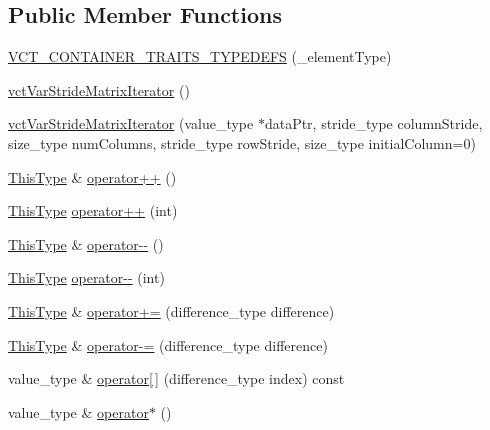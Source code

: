 \subsection*{Public Member Functions}
\begin{DoxyCompactItemize}
\item 
\hyperlink{classvct_var_stride_matrix_iterator_ad10863eaa1222765fd9eeb8dfb58bd41}{V\+C\+T\+\_\+\+C\+O\+N\+T\+A\+I\+N\+E\+R\+\_\+\+T\+R\+A\+I\+T\+S\+\_\+\+T\+Y\+P\+E\+D\+E\+F\+S} (\+\_\+element\+Type)
\item 
\hyperlink{classvct_var_stride_matrix_iterator_a91d9083a1180d5eea8a91f9fd013eb95}{vct\+Var\+Stride\+Matrix\+Iterator} ()
\item 
\hyperlink{classvct_var_stride_matrix_iterator_a458fe56a6f92431c0b63aebbbb87e257}{vct\+Var\+Stride\+Matrix\+Iterator} (value\+\_\+type $\ast$data\+Ptr, stride\+\_\+type column\+Stride, size\+\_\+type num\+Columns, stride\+\_\+type row\+Stride, size\+\_\+type initial\+Column=0)
\item 
\hyperlink{classvct_var_stride_matrix_const_iterator_af68182ea2024c532e999fd1333cb0c6e}{This\+Type} \& \hyperlink{classvct_var_stride_matrix_iterator_a4b8fe42309794755c854d04efb2eb90b}{operator++} ()
\item 
\hyperlink{classvct_var_stride_matrix_const_iterator_af68182ea2024c532e999fd1333cb0c6e}{This\+Type} \hyperlink{classvct_var_stride_matrix_iterator_a5ff0237367032cd027470c1f23edd943}{operator++} (int)
\item 
\hyperlink{classvct_var_stride_matrix_const_iterator_af68182ea2024c532e999fd1333cb0c6e}{This\+Type} \& \hyperlink{classvct_var_stride_matrix_iterator_a55ff9d23cd962659b4057c3f9fc34cdf}{operator-\/-\/} ()
\item 
\hyperlink{classvct_var_stride_matrix_const_iterator_af68182ea2024c532e999fd1333cb0c6e}{This\+Type} \hyperlink{classvct_var_stride_matrix_iterator_a6d10e5918b881d69c226855fe90bfa7a}{operator-\/-\/} (int)
\item 
\hyperlink{classvct_var_stride_matrix_const_iterator_af68182ea2024c532e999fd1333cb0c6e}{This\+Type} \& \hyperlink{classvct_var_stride_matrix_iterator_a44a3c7884b5092d51a2c17d87096a69e}{operator+=} (difference\+\_\+type difference)
\item 
\hyperlink{classvct_var_stride_matrix_const_iterator_af68182ea2024c532e999fd1333cb0c6e}{This\+Type} \& \hyperlink{classvct_var_stride_matrix_iterator_ab72c54ac990087995a41e0a6b99bd9de}{operator-\/=} (difference\+\_\+type difference)
\item 
value\+\_\+type \& \hyperlink{classvct_var_stride_matrix_iterator_a84a6c213039c241a96a80888c4054b48}{operator\mbox{[}$\,$\mbox{]}} (difference\+\_\+type index) const 
\item 
value\+\_\+type \& \hyperlink{classvct_var_stride_matrix_iterator_af938d4d030807e31284107d51f64785a}{operator$\ast$} ()
\end{DoxyCompactItemize}
